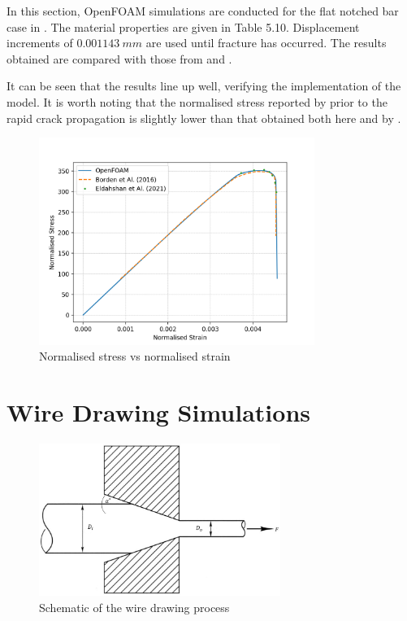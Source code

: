 \documentclass[sn-mathphys,Numbered,draft]{sn-jnl}%
\begin{document}
In this section, OpenFOAM simulations are conducted for the flat notched bar case in \citet{borden_phase-field_2016}. The material properties are given in Table 5.10. Displacement increments of $0.001143\ mm$ are used until fracture has occurred. The results obtained are compared with those from \citet{borden_phase-field_2016} and \citet{eldahshan_phase_2021}. 

It can be seen that the results line up well, verifying the implementation of the model. It is worth noting that the normalised stress reported by \citet{borden_phase-field_2016} prior to the rapid crack propagation is slightly lower than that obtained both here and by \citet{eldahshan_phase_2021}.

\begin{figure}[htb]
\begin{center}
	\includegraphics[width=0.8\textwidth]{./Figures/phaseCompare.png}
\caption{Normalised stress vs normalised strain}
\label{fig:notchedRoundBAr}
\end{center}
\end{figure}




\section{Wire Drawing Simulations}

\begin{figure}[htb]
\begin{center}
	\includegraphics[width=0.7\textwidth]{./Figures/SimulationAndAnalysis/modelCompare/drawingSchematic.png}
\caption{Schematic of the wire drawing process}
\label{fig:notchedRoundBAr}
\end{center}
\end{figure}
\end{document}
